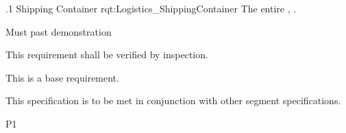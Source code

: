 \ONERQMTV
{\RqtNumberBase.1}
{Shipping Container}
{rqt:Logistics_ShippingContainer}
{The entire \ThisSys, \TBD.}
{
	\item [Phase 1] Must past demonstration
}
{This requirement shall be verified by inspection.}
{
\item [N/A] This is a base requirement.
}
{
	\item This specification is to be met in conjunction with other segment specifications.
}
{P1}

